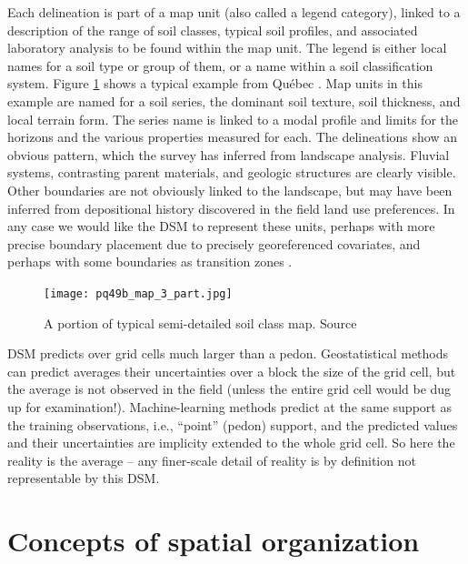\documentclass[soil, manuscript]{copernicus}
\begin{document}
\par
Each delineation is part of a map unit (also called a legend category), linked to a description of the range of soil classes, typical soil profiles, and associated laboratory analysis to be found within the map unit. The legend is either local names for a soil type or group of them, or a name within a soil classification system.
%
Figure \ref{fig:pq49b3} shows a typical example from Qu\'{e}bec \citep{grenonEtudePedologiqueComte1999}.
%
Map units in this example are named for a soil series, the dominant soil texture, soil thickness, and local terrain form.
%
The series name is linked to a modal profile and limits for the horizons and the various properties measured for each.
%
The delineations show an obvious pattern, which the survey has inferred from landscape analysis.
%
Fluvial systems, contrasting parent materials, and geologic structures are clearly visible.
%
Other boundaries are not obviously linked to the landscape, but may have been inferred from depositional history discovered in the field land use preferences.
%
In any case we would like the DSM to represent these units, perhaps with more precise boundary placement due to precisely georeferenced covariates, and perhaps with some boundaries as transition zones \citep{LagacherieFuzzinessuncertaintysoil1996}.

\begin{figure}
  \centering
  \texttt{[image: pq49b\_map\_3\_part.jpg]}  
  \caption{A portion of typical semi-detailed soil class map. Source \citep{grenonEtudePedologiqueComte1999}}
  \label{fig:pq49b3}
\end{figure}

\par
DSM predicts over grid cells much larger than a pedon.
%
Geostatistical methods can predict averages their uncertainties over a block the size of the grid cell, but the average is not observed in the field (unless the entire grid cell would be dug up for examination!).
%
Machine-learning methods predict at the same support as the training observations, i.e., ``point'' (pedon) support, and the predicted values and their uncertainties are implicity extended to the whole grid cell.
%
So here the reality is the average -- any finer-scale detail of reality is by definition not representable by this DSM.

\section{Concepts of spatial organization}
\end{document}
